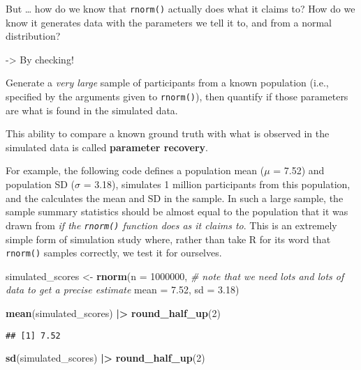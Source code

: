 \documentclass[
]{article}
\newenvironment{Shaded}{\begin{snugshade}}{\end{snugshade}}
\newcommand{\AttributeTok}[1]{\textcolor[rgb]{0.13,0.29,0.53}{#1}}
\newcommand{\CommentTok}[1]{\textcolor[rgb]{0.56,0.35,0.01}{\textit{#1}}}
\newcommand{\DecValTok}[1]{\textcolor[rgb]{0.00,0.00,0.81}{#1}}
\newcommand{\FloatTok}[1]{\textcolor[rgb]{0.00,0.00,0.81}{#1}}
\newcommand{\FunctionTok}[1]{\textcolor[rgb]{0.13,0.29,0.53}{\textbf{#1}}}
\newcommand{\NormalTok}[1]{#1}
\newcommand{\OtherTok}[1]{\textcolor[rgb]{0.56,0.35,0.01}{#1}}
\newcommand{\SpecialCharTok}[1]{\textcolor[rgb]{0.81,0.36,0.00}{\textbf{#1}}}
\begin{document}
But \ldots{} how do we know that \texttt{rnorm()} actually does what it
claims to? How do we know it generates data with the parameters we tell
it to, and from a normal distribution?

-\textgreater{} By checking!

Generate a \emph{very large} sample of participants from a known
population (i.e., specified by the arguments given to \texttt{rnorm()}),
then quantify if those parameters are what is found in the simulated
data.

This ability to compare a known ground truth with what is observed in
the simulated data is called \textbf{parameter recovery}.

For example, the following code defines a population mean (\(\mu\) =
7.52) and population SD (\(\sigma\) = 3.18), simulates 1 million
participants from this population, and the calculates the mean and SD in
the sample. In such a large sample, the sample summary statistics should
be almost equal to the population that it was drawn from \emph{if the
\texttt{rnorm()} function does as it claims to}. This is an extremely
simple form of simulation study where, rather than take R for its word
that \texttt{rnorm()} samples correctly, we test it for ourselves.

\begin{Shaded}
\begin{Highlighting}[]
\NormalTok{simulated\_scores }\OtherTok{\textless{}{-}} \FunctionTok{rnorm}\NormalTok{(}\AttributeTok{n =} \DecValTok{1000000}\NormalTok{, }\CommentTok{\# note that we need lots and lots of data to get a precise estimate }
                          \AttributeTok{mean =} \FloatTok{7.52}\NormalTok{, }
                          \AttributeTok{sd =} \FloatTok{3.18}\NormalTok{)}

\FunctionTok{mean}\NormalTok{(simulated\_scores) }\SpecialCharTok{|\textgreater{}} \FunctionTok{round\_half\_up}\NormalTok{(}\DecValTok{2}\NormalTok{)}
\end{Highlighting}
\end{Shaded}

\begin{verbatim}
## [1] 7.52
\end{verbatim}

\begin{Shaded}
\begin{Highlighting}[]
\FunctionTok{sd}\NormalTok{(simulated\_scores) }\SpecialCharTok{|\textgreater{}} \FunctionTok{round\_half\_up}\NormalTok{(}\DecValTok{2}\NormalTok{)}
\end{Highlighting}
\end{Shaded}
\end{document}

